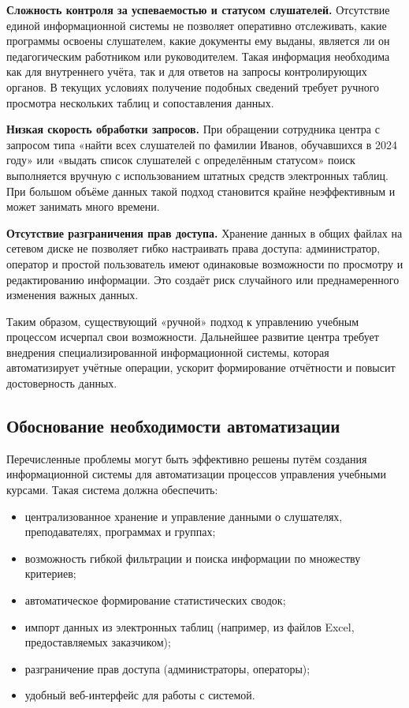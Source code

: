 \textbf{Сложность контроля за успеваемостью и статусом слушателей.} Отсутствие единой информационной системы не позволяет оперативно отслеживать, какие программы освоены слушателем, какие документы ему выданы, является ли он педагогическим работником или руководителем. Такая информация необходима как для внутреннего учёта, так и для ответов на запросы контролирующих органов. В текущих условиях получение подобных сведений требует ручного просмотра нескольких таблиц и сопоставления данных.

\textbf{Низкая скорость обработки запросов.} При обращении сотрудника центра с запросом типа «найти всех слушателей по фамилии Иванов, обучавшихся в 2024 году» или «выдать список слушателей с определённым статусом» поиск выполняется вручную с использованием штатных средств электронных таблиц. При большом объёме данных такой подход становится крайне неэффективным и может занимать много времени.

\textbf{Отсутствие разграничения прав доступа.} Хранение данных в общих файлах на сетевом диске не позволяет гибко настраивать права доступа: администратор, оператор и простой пользователь имеют одинаковые возможности по просмотру и редактированию информации. Это создаёт риск случайного или преднамеренного изменения важных данных.

Таким образом, существующий «ручной» подход к управлению учебным процессом исчерпал свои возможности. Дальнейшее развитие центра требует внедрения специализированной информационной системы, которая автоматизирует учётные операции, ускорит формирование отчётности и повысит достоверность данных.

\subsection{Обоснование необходимости автоматизации}

Перечисленные проблемы могут быть эффективно решены путём создания информационной системы для автоматизации процессов управления учебными курсами. Такая система должна обеспечить:

\begin{itemize}
	\item централизованное хранение и управление данными о слушателях, преподавателях, программах и группах;
	\item возможность гибкой фильтрации и поиска информации по множеству критериев;
	\item автоматическое формирование статистических сводок;
	\item импорт данных из электронных таблиц (например, из файлов Excel, предоставляемых заказчиком);
	\item разграничение прав доступа (администраторы, операторы);
	\item удобный веб-интерфейс для работы с системой.
\end{itemize}

